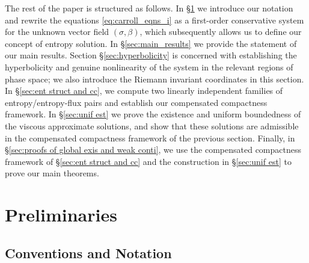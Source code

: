 \documentclass[11pt,a4paper,reqno]{amsart}
\numberwithin{equation}{section}
\theoremstyle{definition}
\theoremstyle{remark}
\begin{document}
{The rest of the paper is structured as follows. In \S \ref{sec:prelim} we introduce our notation and rewrite the equations \eqref{eq:carroll_eqns_i} as a first-order conservative system for the unknown vector field $(\sigma,\beta)$, which subsequently allows us to define our concept of entropy solution. In \S \ref{sec:main_results} we provide the statement of our main results. Section \S \ref{sec:hyperbolicity} is concerned with establishing the hyperbolicity and genuine nonlinearity of the system in the relevant regions of phase space; we also introduce the Riemann invariant coordinates in this section. In \S \ref{sec:ent struct and cc}, we compute two linearly independent families of entropy/entropy-flux pairs and establish our compensated compactness framework. In \S \ref{sec:unif est} we prove the existence and uniform boundedness of the viscous approximate solutions, and show that these solutions are admissible in the compensated compactness framework of the previous section. Finally, in \S \ref{sec:proofs of global exis and weak conti}, we use the compensated compactness framework of \S \ref{sec:ent struct and cc} and the construction in \S \ref{sec:unif est} to prove our main theorems. 




\section{Preliminaries}\label{sec:prelim}

\subsection{Conventions and Notation}

}
\end{document}
